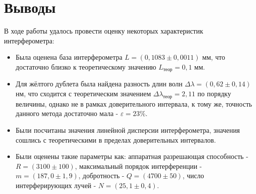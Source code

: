 \documentclass[a4paper,12pt]{extarticle}
\begin{document}
\section*{Выводы}
В ходе работы удалось провести оценку некоторых характеристик интерферометра:
\begin{itemize}
    \item Была оценена база интерферометра $L = (0,1083 \pm 0,0011)$ мм, что достаточно близко к теоретическому значению $L_{\text{теор}} = 0,1$ мм.
    \item Для жёлтого дублета была найдена разность длин волн $\Delta \lambda = (0,62 \pm 0,14)$ нм, что сходится с теоретическим значением $\Delta \lambda_{\text{теор}} = 2,11$ по порядку величины, однако не в рамках доверительного интервала, к тому же, точность данного метода достаточно мала - $\varepsilon = 23 \%$.
    \item Были посчитаны значения линейной дисперсии интерферометра, значения сошлись с теоретическими в пределах доверительных интервалов.
    \item Были оценены такие параметры как: аппаратная разрешающая способность - $R = (3100 \pm 100)$, максимальный порядок интерференции - $m = (187,0 \pm 1,9)$, добротность - $Q = (4700 \pm 50)$, число интерферирующих лучей - $N = (25,1 \pm 0,4)$.
\end{itemize}
\end{document}
